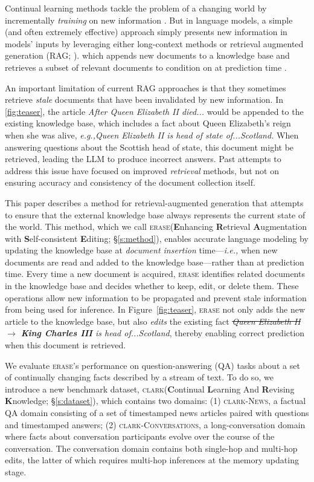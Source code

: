 \documentclass[11pt]{article}
\newcommand{\ourmethod}{\textsc{erase}\xspace}
\newcommand{\ourmethodlong}{\textbf{E}nhancing \textbf{R}etrieval \textbf{A}ugmentation with \textbf{S}elf-consistent \textbf{E}diting\xspace}
\newcommand{\ourdataset}{\textsc{clark}\xspace}
\newcommand{\ourdatasetfull}{\textbf{C}ontinual \textbf{L}earning And \textbf{R}evising \textbf{K}nowledge\xspace}
\newcommand{\eg}{\emph{e.g.,}\xspace}
\newcommand{\ie}{\emph{i.e.,}\xspace}
\newcommand{\quotetext}[1]{\emph{#1}}
\newcommand{\sect}[1]{\S\ref{#1}}
\begin{document}
Continual learning methods tackle the problem of a changing world by incrementally \emph{training} on new information \cite{nell, wang2024comprehensive}. 
But in language models, a simple (and often extremely effective) approach simply presents new information in models' inputs by leveraging either long-context methods
\citep{efficientTansformers} or retrieval augmented generation (RAG; \citealp{RAG}).
which appends new documents to a knowledge base and retrieves a subset of relevant documents to condition on at prediction time \citep{guu2020, lewis2020}.

An important limitation of current RAG approaches is that they sometimes retrieve \emph{stale} documents that have been invalidated by new information. In \cref{fig:teaser}, the article \quotetext{After Queen Elizabeth II died...} would be appended to the existing knowledge base, which includes a fact about Queen Elizabeth's reign when she was alive, \eg \quotetext{Queen Elizabeth II is head of state of...Scotland.} When answering questions about the Scottish head of state, this document might be retrieved, leading the LLM to produce incorrect answers. Past attempts to address this issue have focused on improved \emph{retrieval} methods, but not on ensuring accuracy and consistency of the document collection itself.

This paper describes a method for retrieval-augmented generation that attempts to ensure that the external knowledge base always represents the {current} state of the world. This method, which we call \ourmethod (\ourmethodlong; \sect{s:method}), enables accurate language modeling by updating the knowledge base at \emph{document insertion} time---\ie when new documents are read and added to the knowledge base---rather than at prediction time. Every time a new document is acquired, \ourmethod identifies related documents in the knowledge base and decides whether to keep, edit, or delete them. These operations allow new information to be propagated and prevent stale information from being used for inference. In Figure~\ref{fig:teaser}, \ourmethod not only adds the new article to the knowledge base, but also \emph{edits} the existing fact \quotetext{\st{Queen Elizabeth II} 
$\rightarrow$ \textbf{King Charles III} is head of...Scotland}, thereby enabling correct prediction when this document is retrieved.

We evaluate \ourmethod's performance on question-answering (QA) tasks about a set of continually changing facts described by a stream of text. 
To do so, we introduce a new benchmark dataset, \ourdataset (\ourdatasetfull; \sect{s:dataset}), which contains two domains: (1) \ourdataset-\textsc{News}, a factual QA domain consisting of a set of timestamped news articles paired with questions and timestamped answers; (2) \ourdataset-\textsc{Conversations}, a long-conversation domain where facts about conversation participants evolve over the course of the conversation. The conversation domain contains both single-hop 
and multi-hop edits, the latter of which requires multi-hop inferences at the memory updating stage. 
\end{document}
